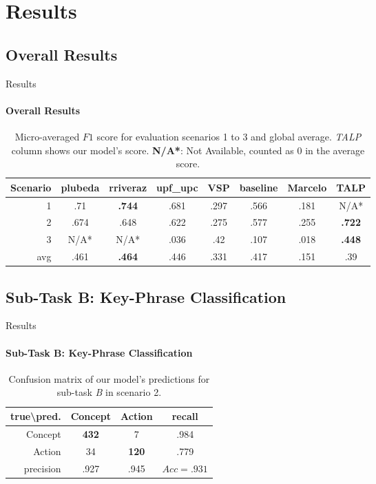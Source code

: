 \documentclass{beamer}
\begin{document}
\section{Results}


\subsection{Overall Results}

\begin{frame}{Results}
\framesubtitle{Overall Results}
    \begin{table}[ht]
    \centering
\begin{tabular}{r|cccccc|c}
\toprule
{\footnotesize{Scenario}} & {\footnotesize{plubeda}} & {\footnotesize{rriveraz}} & {\footnotesize{upf\_upc}} & {\footnotesize{VSP}} & {\footnotesize{baseline}} & {\footnotesize{Marcelo}} & {\footnotesize{TALP}} \\
\midrule
1 & .71 & \textbf{.744} & .681 & .297 & .566 & .181 & {\footnotesize{N/A*}} \\
2 & .674 & .648 & .622 & .275 & .577 & .255 & \textbf{.722} \\
3 & {\footnotesize{N/A*}} & {\footnotesize{N/A*}} & .036 & .42 & .107 & .018 & \textbf{.448} \\
\bottomrule
avg & .461 & \textbf{.464} & .446 & .331 & .417 & .151 & .39 \\
\end{tabular}
    \caption{Micro-averaged $F1$ score for evaluation scenarios 1 to 3 and global average. \emph{TALP} column shows our model's score. \textbf{N/A*}: Not Available, counted as 0 in the average score.}
    \label{tab:results}
\end{table}
\end{frame}

\subsection{Sub-Task B: Key-Phrase Classification}

\begin{frame}{Results}
\framesubtitle{Sub-Task B: Key-Phrase Classification}
    \begin{table}[t]
 \small
    \centering
\begin{tabular}{r|cc|c}
\toprule
true\textbackslash pred. & Concept &  Action & recall \\
\midrule
Concept &  \textbf{432} &       7 &  .984\\
Action  &   34 &     \textbf{120} & .779\\
\bottomrule
precision & .927 & .945 & $Acc=.931$


\end{tabular}
    \caption{Confusion matrix of our model's predictions for sub-task \emph{B} in scenario 2.}
    \label{tab:confusion2a}
\end{table}
\end{frame}
\end{document}
